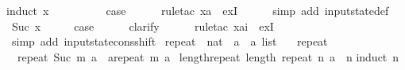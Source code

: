 \begin{isabellebody}
{\isacharparenleft}induct\ x{}{\isacharparenright}\isanewline
\ \ \isamarkupfalse%
\ {}\isanewline
\ \ \isamarkupfalse%
\ \isamarkupfalse%
\ {\isacharquery}case\isanewline
\ \ \ \ \isamarkupfalse%
\ {\isacharparenleft}rule{\isacharunderscore}tac\ x{\isacharequal}{\isachardoublequoteopen}{\isacharbrackleft}a{\isacharbrackright}{\isachardoublequoteclose}\ \ exI{\isacharparenright}\isanewline
\ \ \ \ \isamarkupfalse%
\ {\isacharparenleft}simp\ add{\isacharcolon}\ input{}state{\isacharunderscore}def{\isacharparenright}\isanewline
{}\isamarkupfalse%
\isanewline
\ \ \isamarkupfalse%
\ {\isacharparenleft}Suc\ x{}{\isacharparenright}\isanewline
\ \ \isamarkupfalse%
\ \isamarkupfalse%
\ {\isacharquery}case\isanewline
\ \ \ \ \isamarkupfalse%
\ clarify\isanewline
\ \ \ \ \isamarkupfalse%
\ {\isacharparenleft}rule{\isacharunderscore}tac\ x{\isacharequal}{\isachardoublequoteopen}a{\isacharhash}i{\isachardoublequoteclose}\ \ exI{\isacharparenright}\isanewline
\ \ \ \ \isamarkupfalse%
\ {\isacharparenleft}simp\ add{\isacharcolon}\ input{}state{\isacharunderscore}cons{\isacharunderscore}shift{\isacharparenright}\isanewline
{}\isamarkupfalse%
%
\endisatagproof
{\isafoldproof}%
%
\isadelimproof
\isanewline
%
\endisadelimproof
\isanewline
{}\isamarkupfalse%
\ repeat\ {\isacharcolon}{\isacharcolon}\ {\isachardoublequoteopen}nat\ {\isasymRightarrow}\ {\isacharprime}a\ {\isasymRightarrow}\ {\isacharprime}a\ list{\isachardoublequoteclose}\ \isanewline
\ \ {\isachardoublequoteopen}repeat\ {}\ {\isacharunderscore}\ {\isacharequal}\ {\isacharbrackleft}{\isacharbrackright}{\isachardoublequoteclose}\ {\isacharbar}\isanewline
\ \ {\isachardoublequoteopen}repeat\ {\isacharparenleft}Suc\ m{\isacharparenright}\ a\ {\isacharequal}\ a{\isacharhash}{\isacharparenleft}repeat\ m\ a{\isacharparenright}{\isachardoublequoteclose}\isanewline
\isanewline
{}\isamarkupfalse%
\ length{\isacharunderscore}repeat{\isacharcolon}\ {\isachardoublequoteopen}length\ {\isacharparenleft}repeat\ n\ a{\isacharparenright}\ {\isacharequal}\ n{\isachardoublequoteclose}\isanewline
%
\isadelimproof
%
\endisadelimproof
%
\isatagproof
{}\isamarkupfalse%
{\isacharparenleft}induct\ n{\isacharparenright}\isanewline
\ \ \isamarkupfalse%

\end{isabellebody}
